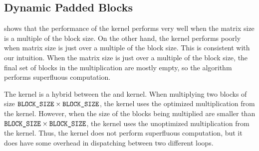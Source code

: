 \subsection{Dynamic Padded Blocks}
 shows that the performance of the 
kernel performs very well when the matrix size is a multiple of the block size.
On the other hand, the kernel performs poorly when matrix size is just over a
multiple of the block size. This is consistent with our intuition. When the
matrix size is just over a multiple of the block size, the final set of blocks
in the multiplication are mostly empty, so the algorithm performs superfluous
computation.

The  kernel is a hybrid between the
 and  kernel. When multiplying two
blocks of size $\texttt{BLOCK\_SIZE} \times \texttt{BLOCK\_SIZE}$, the kernel uses
the optimized multiplication from the  kernel. However,
when the size of the blocks being multiplied are smaller than
$\texttt{BLOCK\_SIZE} \times \texttt{BLOCK\_SIZE}$, the kernel uses the unoptimized
multiplication from the  kernel. Thus, the
 kernel does not perform superfluous computation, but
it does have some overhead in dispatching between two different loops.

